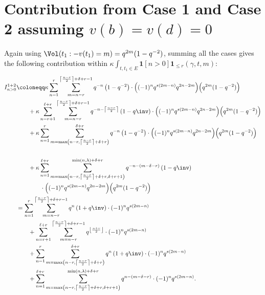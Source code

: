 \section{Contribution from Case 1 and Case 2 assuming $v(b)=v(d)=0$}
Again using $\Vol(t_1:-v(t_1)=m) = q^{2m} (1-q^{-2})$,
summing all the cases gives
the following contribution within
$\kappa \int_{t, t_1 \in E} \mathbf{1}[n > 0] \mathbf{1}_{\le r}(\gamma,t,m)$:
\begin{align*}
  I_{n > 0}^{\text{1+2}}
  &\coloneqq \kappa \sum_{n=1}^{r}
    \sum_{m=n-r}^{\left\lceil \frac{n-r}{2} \right\rceil+\delta+r-1}
    q^{-n} \left( 1 - q^{-2} \right)
      \cdot \Big( (-1)^n q^{s(2m-n)} q^{2n-2m} \Big) \Big( q^{2m}(1-q^{-2}) \Big) \\
  &\qquad+ \kappa \sum_{n=r+1}^{\ell+r}
    \sum_{m=n-r}^{\left\lceil \frac{n-r}{2} \right\rceil+\delta+r-1}
    q^{-n - \left\lceil \frac{n-r}{2} \right\rceil} \left( 1 - q\inv \right)
      \cdot \Big( (-1)^n q^{s(2m-n)} q^{2n-2m} \Big) \Big( q^{2m}(1-q^{-2}) \Big) \\
  &\qquad+ \kappa \sum_{n=1}^{r}
    \sum_{m=\max\left(n-r, \left\lceil \frac{n-r}{2} \right\rceil+\delta+r\right)}^{\delta+r}
    q^{-n} \left( 1 - q^{-2} \right)
      \cdot \Big( (-1)^n q^{s(2m-n)} q^{2n-2m} \Big) \Big( q^{2m}(1-q^{-2}) \Big) \\
    \\
  &\qquad+ \kappa \sum_{n=1}^{\ell+r}
    \sum_{m=\max\left(n-r, \left\lceil \frac{n-r}{2} \right\rceil+\delta+r, \delta+r+1 \right)}^{\min(n,\lambda)+\delta+r}
    q^{-n - (m-\delta-r)} \left( 1 - q\inv \right)
      \\ &\qquad\qquad
      \cdot \Big( (-1)^n q^{s(2m-n)} q^{2n-2m} \Big) \Big( q^{2m}(1-q^{-2}) \Big) \\
  &= \sum_{n=1}^{r}
    \sum_{m=n-r}^{\left\lceil \frac{n-r}{2} \right\rceil+\delta+r-1}
    q^{n} \left( 1 + q\inv \right)
      \cdot (-1)^n q^{s(2m-n)} \\
  &\qquad+ \sum_{n=r+1}^{\ell+r}
    \sum_{m=n-r}^{\left\lceil \frac{n-r}{2} \right\rceil+\delta+r-1}
    q^{\left\lfloor \frac{n+r}{2} \right\rfloor}
      \cdot (-1)^n q^{s(2m-n)} \\
  &\qquad+ \sum_{n=1}^{r}
    \sum_{m=\max\left(n-r, \left\lceil \frac{n-r}{2} \right\rceil+\delta+r\right)}^{\delta+r}
    q^{n} \left( 1 + q\inv \right)
      \cdot (-1)^n q^{s(2m-n)} \\
  &\qquad+ \sum_{n=1}^{\ell+r}
    \sum_{m=\max\left(n-r, \left\lceil \frac{n-r}{2} \right\rceil+\delta+r, \delta+r+1 \right)}^{\min(n,\lambda)+\delta+r}
    q^{n - (m-\delta-r)}
      \cdot (-1)^n q^{s(2m-n)}.
\end{align*}
